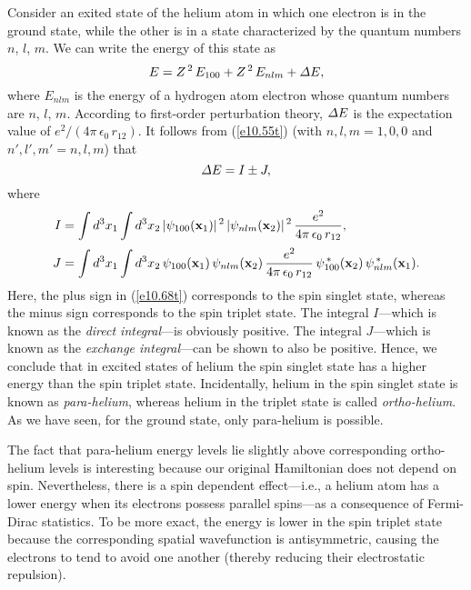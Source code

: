 Consider an exited state of the helium atom in which one electron is in the ground state, while the other is in a state characterized by the quantum
numbers $n$, $l$, $m$. We can write the energy of this state as
\begin{equation}
E = Z^{\,2}\,E_{100} + Z^{\,2}\,E_{nlm} + {\mit\Delta E},
\end{equation}
where $E_{nlm}$ is the energy of a hydrogen atom electron whose quantum numbers are $n$, $l$, $m$. 
According to first-order perturbation theory, ${\mit\Delta E}$ is the expectation value of $e^2/(4\pi\,\epsilon_0\,r_{12})$. It follows from
(\ref{e10.55t}) (with $n,l,m=1,0,0$ and $n',l',m'=n,l,m$) that
\begin{equation}\label{e10.68t}
{\mit\Delta}E = I\pm J,
\end{equation}
where
\begin{align}
I &= \int d^3 x_1\int d^3 x_2\, |\psi_{100}({\bf x}_1)|^{\,2}\,|\psi_{nlm}({\bf x}_2)|^{\,2}\,\frac{e^2}{4\pi\,\epsilon_0\,r_{12}},\\[0.5ex]
J&= \int d^3 x_1\int d^3 x_2 \,\psi_{100}({\bf x}_1)\,\psi_{nlm}({\bf x}_2)\,\frac{e^2}{4\pi\,\epsilon_0\,r_{12}}\,\psi_{100}^{\,\ast}({\bf x}_2)\,\psi_{nlm}^{\,\ast}({\bf x}_1).
\end{align}
Here, the plus sign in (\ref{e10.68t}) corresponds to the spin singlet state, whereas the minus sign corresponds to the spin triplet state. The
integral $I$---which is known as the  {\em direct integral}---is obviously positive. The integral $J$---which is known as the {\em exchange integral}---can
be shown to also be positive. Hence, we conclude that in excited states of helium  the spin singlet state has a higher energy
than the spin triplet state. Incidentally, helium in the spin singlet state is known as {\em para-helium}, whereas helium in the triplet state is
called {\em ortho-helium}. As we have seen, for the ground state, only para-helium is possible. 

The fact that para-helium energy levels lie slightly above corresponding ortho-helium levels is interesting because our original Hamiltonian does not
depend on spin. Nevertheless, there is a spin dependent effect---i.e., a helium atom has a lower energy when its electrons possess parallel spins---as a consequence of
Fermi-Dirac statistics. To be more exact, the energy is lower in the spin triplet state because the corresponding spatial wavefunction is antisymmetric,
causing the electrons to tend to avoid one another (thereby reducing their electrostatic repulsion). 

